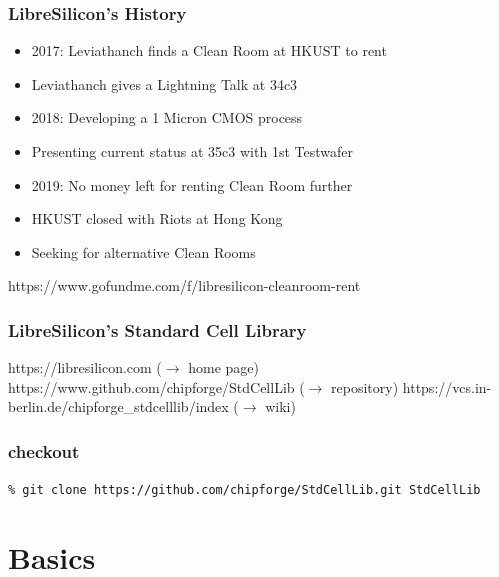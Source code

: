 \documentclass[aspectratio=169]{beamer}
\begin{document}
\begin{frame}
\frametitle{LibreSilicon's History}
    \begin{itemize}
        \item 2017: Leviathanch finds a Clean Room at HKUST to rent
        \item Leviathanch gives a Lightning Talk at 34c3
        \item 2018: Developing a 1 Micron CMOS process
        \item Presenting current status at 35c3 with 1st Testwafer
        \item 2019: No money left for renting Clean Room further
        \item HKUST closed with Riots at Hong Kong
        \item Seeking for alternative Clean Rooms
    \end{itemize}

https://www.gofundme.com/f/libresilicon-cleanroom-rent
\end{frame}


\begin{frame}
\frametitle{LibreSilicon's Standard Cell Library} 
https://libresilicon.com ($\rightarrow$ home page) \newline
https://www.github.com/chipforge/StdCellLib ($\rightarrow$ repository) \newline
https://vcs.in-berlin.de/chipforge\_stdcelllib/index ($\rightarrow$ wiki) \newline
\end{frame}


\begin{frame}
\frametitle{checkout}
\texttt{\% git clone https://github.com/chipforge/StdCellLib.git StdCellLib}
\end{frame}

\section{Basics}

\end{document}
